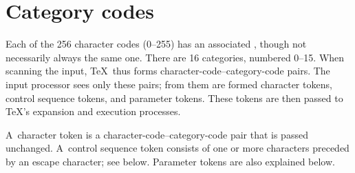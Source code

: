 \documentclass{book}
\begin{document}
\section{Category codes}

Each of the 256 character codes (0--255) has an
associated , though not necessarily always the same one.
There are 16 categories, numbered 0--15. 
When scanning the input, \TeX\
thus forms character-code--category-code pairs.
The input processor sees only these pairs; from them are formed
character tokens, control sequence tokens, and parameter tokens.
These tokens are then passed to \TeX's expansion and execution
processes.

A~character token is a character-code--category-code
pair that is passed unchanged.
A~control sequence token consists of one or more characters
preceded by an escape character; see below.
Parameter tokens are also explained below.
\end{document}

